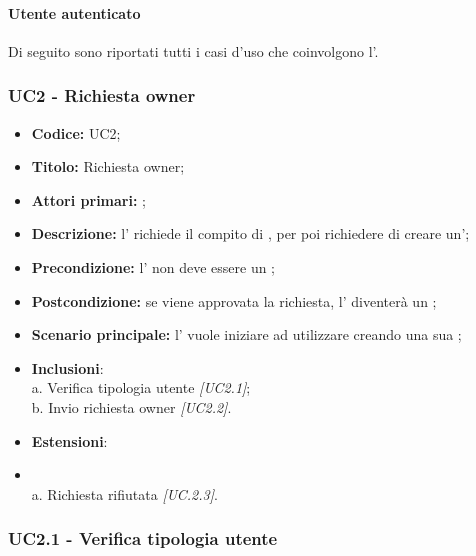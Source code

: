 \documentclass[casi-duso]{subfiles}
\begin{document}


\paragraph{Utente autenticato}
\label{par:utente-autenticato}
Di seguito sono riportati tutti i casi d'uso che coinvolgono l'.

\subsubsection{UC2 - Richiesta owner}
\label{subsub:UC2}

\begin{itemize}
  \item \textbf{Codice:} UC2;
  \item \textbf{Titolo:} Richiesta owner;
  \item \textbf{Attori primari:} ;
  \item \textbf{Descrizione:} l' richiede il compito di , per poi richiedere di creare un';
  \item \textbf{Precondizione:} l' non deve essere un ;
  \item \textbf{Postcondizione:} se viene approvata la richiesta, l' diventerà un ;
  \item \textbf{Scenario principale:} l' vuole iniziare ad utilizzare  creando una sua ;
  \item \textbf{Inclusioni}:
        \\a. Verifica tipologia utente \emph{[UC2.1]};
        \\b. Invio richiesta owner \emph{[UC2.2]}.
  \item \textbf{Estensioni}:
  \item \\a. Richiesta rifiutata \emph{[UC.2.3]}.

\end{itemize}


\subsubsection{UC2.1 - Verifica tipologia utente}
\label{subsub:UC2.1}
\end{document}
